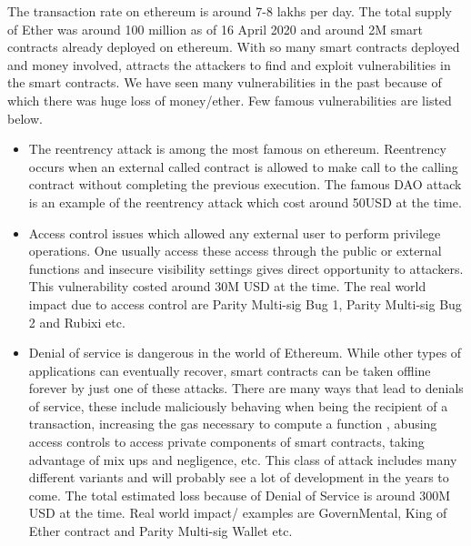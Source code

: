 The transaction rate on ethereum is around 7-8 lakhs per day\cite{etherscanchart}. The total supply of Ether was around 100 million as of 16 April 2020\cite{ether} and around 2M smart contracts already deployed on ethereum\cite{cointelegrah}. With so many smart contracts deployed and money involved, attracts the attackers to find and exploit vulnerabilities in the smart contracts. We have seen many vulnerabilities in the past because of which there was huge loss of money/ether\cite{dasp}. Few famous vulnerabilities are listed below.
\begin{itemize}
    \item The reentrency attack is among the most famous on ethereum. Reentrency occurs when an external called contract is allowed to make call to the calling contract without completing the previous execution. The famous DAO attack\cite{dao} is an example of the reentrency attack which cost around 50USD at the time.
    \item Access control issues which allowed any external user to perform privilege operations. One usually access these access through the public or external functions and insecure visibility settings gives direct opportunity to attackers. This vulnerability costed around 30M USD at the time. The real world impact due to access control are Parity Multi-sig Bug 1\cite{self1}, Parity Multi-sig Bug 2\cite{self2} and Rubixi\cite{rubixi} etc.
    \item Denial of service is dangerous in the world of Ethereum. While other types of applications can eventually recover, smart contracts can be taken offline forever by just one of these attacks. There are many ways that lead to denials of service, these include maliciously behaving when being the recipient of a transaction, increasing the gas necessary to compute a function , abusing access controls to access private components of smart contracts, taking advantage of mix ups and negligence, etc. This class of attack includes many different variants and will probably see a lot of development in the years to come. The total estimated loss because of Denial of Service is around 300M USD at the time. Real world impact/ examples are GovernMental\cite{governmental}, King of Ether contract\cite{koet1} and Parity Multi-sig Wallet\cite{self2} etc.
\end{itemize}  

